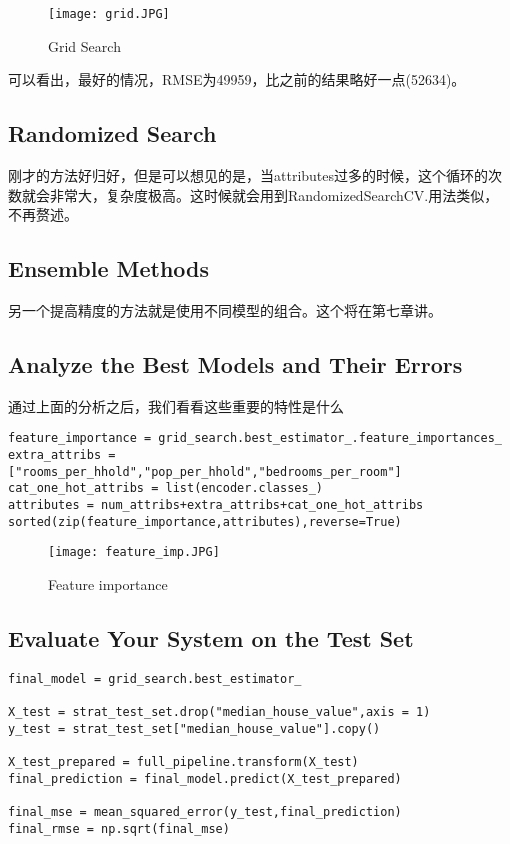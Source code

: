 \documentclass[UTF8]{ctexart}
\begin{document}
\begin{figure}[H]
\centering
\texttt{[image: grid.JPG]}
\caption{Grid Search}
\end{figure}

可以看出，最好的情况，RMSE为49959，比之前的结果略好一点(52634)。

\subsection{Randomized Search}
刚才的方法好归好，但是可以想见的是，当attributes过多的时候，这个循环的次数就会非常大，复杂度极高。这时候就会用到RandomizedSearchCV.用法类似，不再赘述。

\subsection{Ensemble Methods}

另一个提高精度的方法就是使用不同模型的组合。这个将在第七章讲。

\subsection{Analyze the Best Models and Their Errors}

通过上面的分析之后，我们看看这些重要的特性是什么


\begin{lstlisting}
feature_importance = grid_search.best_estimator_.feature_importances_
extra_attribs = ["rooms_per_hhold","pop_per_hhold","bedrooms_per_room"]
cat_one_hot_attribs = list(encoder.classes_)
attributes = num_attribs+extra_attribs+cat_one_hot_attribs
sorted(zip(feature_importance,attributes),reverse=True)
\end{lstlisting}

\begin{figure}[H]
\centering
\texttt{[image: feature\_imp.JPG]}
\caption{Feature importance}
\end{figure}

\subsection{Evaluate Your System on the Test Set}

\begin{lstlisting}
final_model = grid_search.best_estimator_

X_test = strat_test_set.drop("median_house_value",axis = 1)
y_test = strat_test_set["median_house_value"].copy()

X_test_prepared = full_pipeline.transform(X_test)
final_prediction = final_model.predict(X_test_prepared)

final_mse = mean_squared_error(y_test,final_prediction)
final_rmse = np.sqrt(final_mse)
\end{lstlisting}
\end{document}
